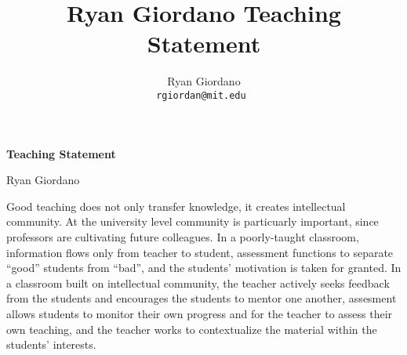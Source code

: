 

\usepackage{enumitem}

\usepackage{geometry}
\geometry{top=0.9in}
\geometry{left=1.4in}
\geometry{right=1.4in}


\title{Ryan Giordano Teaching Statement}

\author{
  Ryan Giordano \\ \texttt{rgiordan@mit.edu }
}




\begin{minipage}[t]{0.5\textwidth}
\hspace{-2em} %
{\bf \LARGE Teaching Statement}\\
\end{minipage}
\begin{minipage}[t]{0.5\textwidth}
        \hspace{8em} %
        {\LARGE Ryan Giordano}
\end{minipage}

Good teaching does not only transfer knowledge, it creates intellectual
community. At the university level community is particuarly important, since
professors are cultivating future colleagues.  In a poorly-taught classroom,
information flows only from teacher to student, assessment functions to separate
``good'' students from ``bad'', and the students' motivation is taken for
granted.  In a classroom built on intellectual community, the teacher actively
seeks feedback from the students and encourages the students to mentor one
another, assesment allows students to monitor their own progress and for the
teacher to assess their own teaching, and the teacher works to contextualize the
material within the students' interests.

